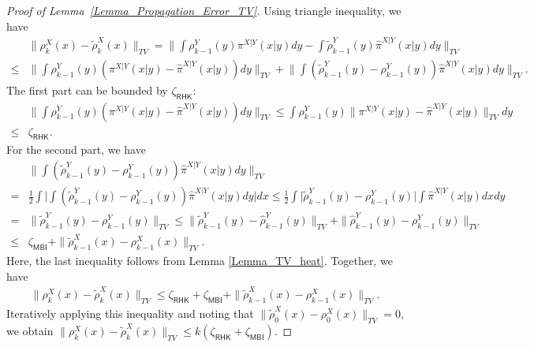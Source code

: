 \begin{proof}[Proof of Lemma~\ref{Lemma_Propagation_Error_TV}]
    Using triangle inequality, we have 
    \begin{align*}
            &\|\rho_{k}^{X}(x) - \tilde{\rho}_{k}^{X}(x)\|_{TV}
            = \Big\|\int \rho_{k-1}^{Y}(y) \pi^{X|Y}(x|y) dy  - \int \tilde{\rho}_{k-1}^{Y}(y) \hat{\pi}^{X|Y}(x|y) dy\Big\|_{TV} \\
            \le& \Big\|\int \rho_{k-1}^{Y}(y) (\pi^{X|Y}(x|y) - \hat{\pi}^{X|Y}(x|y))  dy\Big\|_{TV} 
            + \Big\| \int (\tilde{\rho}_{k-1}^{Y}(y) - \rho_{k-1}^{Y}(y) ) \hat{\pi}^{X|Y}(x|y) dy\Big\|_{TV}.
    \end{align*}
    The first part can be bounded by $\zeta_{\mathsf{RHK}}$:
    \begin{align*}
            &\Big\|\int \rho_{k-1}^{Y}(y) (\pi^{X|Y}(x|y) - \hat{\pi}^{X|Y}(x|y))  dy\Big\|_{TV} 
            \le \int \rho_{k-1}^{Y}(y) \Big\|\pi^{X|Y}(x|y) - \hat{\pi}^{X|Y}(x|y) \Big\|_{TV}  dy \\
            \le & \zeta_{\mathsf{RHK}}.
    \end{align*} 
    For the second part, we have 
    \begin{align*}
            &\Big\| \int (\tilde{\rho}_{k-1}^{Y}(y) - \rho_{k-1}^{Y}(y) ) \hat{\pi}^{X|Y}(x|y) dy\Big\|_{TV} \\
            = & \frac{1}{2}\int \Big| \int (\tilde{\rho}_{k-1}^{Y}(y) - \rho_{k-1}^{Y}(y) ) \hat{\pi}^{X|Y}(x|y) dy \Big| dx
            \le \frac{1}{2}\int \Big|\tilde{\rho}_{k-1}^{Y}(y) - \rho_{k-1}^{Y}(y) \Big| \int \hat{\pi}^{X|Y}(x|y) dx dy \\
            = & \|\tilde{\rho}_{k-1}^{Y}(y) - \rho_{k-1}^{Y}(y)\|_{TV}
            \le \|\tilde{\rho}_{k-1}^{Y}(y) - \hat{\rho}_{k-1}^{Y}(y)\|_{TV} + \|\hat{\rho}_{k-1}^{Y}(y) - \rho_{k-1}^{Y}(y)\|_{TV} \\
            \le & \zeta_{\mathsf{MBI}} + \|\tilde{\rho}_{k-1}^{X}(x) - \rho_{k-1}^{X}(x)\|_{TV}.
    \end{align*}
    Here, the last inequality follows from Lemma \ref{Lemma_TV_heat}. Together, we have
    \begin{align*}
        \|\rho_{k}^{X}(x) - \tilde{\rho}_{k}^{X}(x)\|_{TV}
        \le \zeta_{\mathsf{RHK}} + \zeta_{\mathsf{MBI}} + \|\tilde{\rho}_{k-1}^{X}(x) - \rho_{k-1}^{X}(x)\|_{TV}.
    \end{align*}
    Iteratively applying this inequality and noting that $\|\tilde{\rho}_{0}^{X}(x) - \rho_{0}^{X}(x)\|_{TV} = 0$, 
    we obtain $\|\rho_{k}^{X}(x) - \tilde{\rho}_{k}^{X}(x)\|_{TV} \le k (\zeta_{\mathsf{RHK}} + \zeta_{\mathsf{MBI}})$.
\end{proof}

